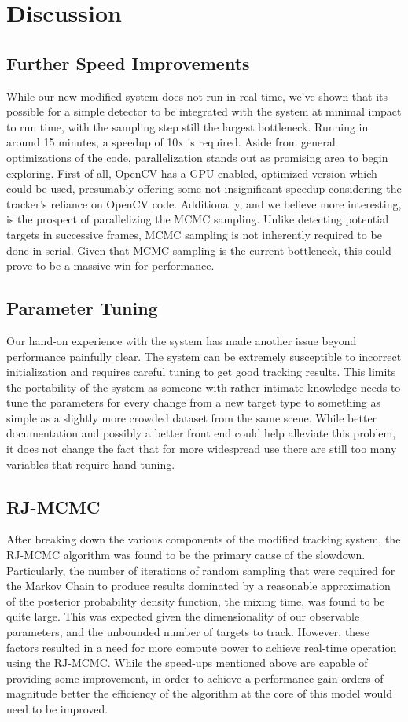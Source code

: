 \section{Discussion}
\label{sec:disc}

\subsection{Further Speed Improvements}
	While our new modified system does not run in real-time, we've shown that its possible for a simple detector to be
	integrated with the system at minimal impact to run time, with the sampling step still the largest bottleneck. Running
	in around 15 minutes, a speedup of 10x is required. Aside from general optimizations of the code, parallelization stands
	out as promising area to begin exploring. First of all, OpenCV has a GPU-enabled, optimized version which could be used,
	presumably offering some not insignificant speedup considering the tracker's reliance on OpenCV code. Additionally, and
	we believe more interesting, is the prospect of parallelizing the MCMC sampling. Unlike detecting potential targets in
	successive frames, MCMC sampling is not inherently required to be done in serial. Given that MCMC sampling is the
	current bottleneck, this could prove to be a massive win for performance. 

\subsection{Parameter Tuning}
	Our hand-on experience with the system has made another issue beyond performance painfully clear. The system can be 
	extremely susceptible to incorrect initialization and requires careful tuning to get good tracking results. This limits the
	portability of the system as someone with rather intimate knowledge needs to tune the parameters for every change from
	a new target type to something as simple as a slightly more crowded dataset from the same scene. While better
	documentation and possibly a better front end could help alleviate this problem, it does not change the fact that for more
	widespread use there are still too many variables that require hand-tuning. 

\subsection{RJ-MCMC}
	After breaking down the various components of the modified tracking system, the RJ-MCMC algorithm was found to
	be the primary cause of the slowdown. Particularly, the number of iterations of random sampling that were required for
	the Markov Chain to produce results dominated by a reasonable approximation of the posterior probability density
	function, the mixing time, was found to be quite large. This was expected given the dimensionality of our observable
	parameters, and the unbounded number of targets to track. However, these factors resulted in a need for more
	compute power to achieve real-time operation using the RJ-MCMC. While the speed-ups mentioned above are
	capable of providing some improvement, in order to achieve a performance gain orders of magnitude better the
	efficiency of the algorithm at the core of this model would need to be improved.